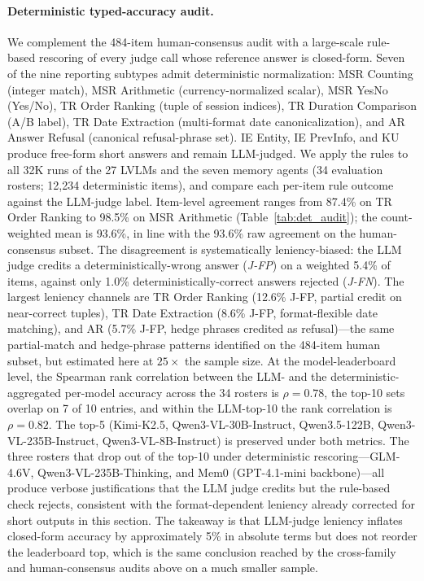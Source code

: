 \documentclass{article}
\begin{document}
\paragraph{Deterministic typed-accuracy audit.}
We complement the 484-item human-consensus audit with a large-scale rule-based rescoring of every judge call whose reference answer is closed-form. Seven of the nine reporting subtypes admit deterministic normalization: MSR Counting (integer match), MSR Arithmetic (currency-normalized scalar), MSR YesNo (Yes/No), TR Order Ranking (tuple of session indices), TR Duration Comparison (A/B label), TR Date Extraction (multi-format date canonicalization), and AR Answer Refusal (canonical refusal-phrase set). IE Entity, IE PrevInfo, and KU produce free-form short answers and remain LLM-judged. We apply the rules to all 32K runs of the 27 LVLMs and the seven memory agents (34 evaluation rosters; 12{,}234 deterministic items), and compare each per-item rule outcome against the LLM-judge label.
Item-level agreement ranges from 87.4\% on TR Order Ranking to 98.5\% on MSR Arithmetic (Table~\ref{tab:det_audit}); the count-weighted mean is 93.6\%, in line with the 93.6\% raw agreement on the human-consensus subset.
The disagreement is systematically leniency-biased: the LLM judge credits a deterministically-wrong answer (\textit{J-FP}) on a weighted 5.4\% of items, against only 1.0\% deterministically-correct answers rejected (\textit{J-FN}). The largest leniency channels are TR Order Ranking (12.6\% J-FP, partial credit on near-correct tuples), TR Date Extraction (8.6\% J-FP, format-flexible date matching), and AR (5.7\% J-FP, hedge phrases credited as refusal)---the same partial-match and hedge-phrase patterns identified on the 484-item human subset, but estimated here at $25{\times}$ the sample size.
At the model-leaderboard level, the Spearman rank correlation between the LLM- and the deterministic-aggregated per-model accuracy across the 34 rosters is $\rho = 0.78$, the top-10 sets overlap on 7 of 10 entries, and within the LLM-top-10 the rank correlation is $\rho = 0.82$. The top-5 (Kimi-K2.5, Qwen3-VL-30B-Instruct, Qwen3.5-122B, Qwen3-VL-235B-Instruct, Qwen3-VL-8B-Instruct) is preserved under both metrics. The three rosters that drop out of the top-10 under deterministic rescoring---GLM-4.6V, Qwen3-VL-235B-Thinking, and Mem0 (GPT-4.1-mini backbone)---all produce verbose justifications that the LLM judge credits but the rule-based check rejects, consistent with the format-dependent leniency already corrected for short outputs in this section. The takeaway is that LLM-judge leniency inflates closed-form accuracy by approximately 5\% in absolute terms but does not reorder the leaderboard top, which is the same conclusion reached by the cross-family and human-consensus audits above on a much smaller sample.
\end{document}
